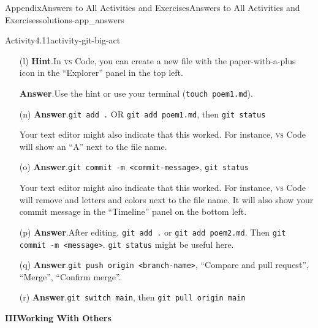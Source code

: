 \documentclass[oneside,10pt,]{book}
\newcommand{\blocktitlefont}{\relax}
\newcommand{\mono}[1]{\texttt{#1}}
\newcommand{\initialism}[1]{\textsc{\MakeLowercase{#1}}}
\begin{document}
\begin{solutions-chapter}{Appendix}{Answers to All Activities and Exercises}{}{Answers to All Activities and Exercises}{}{}{solutions-app_answers}
\begin{activitysolution}{Activity}{4.11}{}{activity-git-big-act}
\begin{enumerate}[font=\bfseries,label=(\alph*),ref=\alph*]
\par
Note that you could split up each poem into its own branch. Depending on the length of your poems, you may want to do that in practice but here we will edit both on one branch. That way you can practice two commits in one push!%
\item[(l)]\noindent\textbf{\blocktitlefont Hint}.\hypertarget{hint-git-big-act-m-b-back}{}\quad{}In \initialism{VS} Code, you can create a new file with the paper-with-a-plus icon in the ``Explorer'' panel in the top left.%
\par\smallskip%
\noindent\textbf{\blocktitlefont Answer}.\hypertarget{answer-git-big-act-m-c-back}{}\quad{}Use the hint or use your terminal (\mono{touch poem1.md}).%
\item[(n)]\noindent\textbf{\blocktitlefont Answer}.\hypertarget{answer-git-big-act-o-b-back}{}\quad{}\mono{git add .} OR \mono{git add poem1.md}, then \mono{git status}%
\par
Your text editor might also indicate that this worked. For instance, \initialism{VS} Code will show an ``A'' next to the file name.%
\item[(o)]\noindent\textbf{\blocktitlefont Answer}.\hypertarget{answer-git-big-act-p-b-back}{}\quad{}\mono{git commit -m \textquotedbl{}<commit-message>\textquotedbl{}}, \mono{git status}%
\par
Your text editor might also indicate that this worked. For instance, \initialism{VS} Code will remove and letters and colors next to the file name. It will also show your commit message in the ``Timeline'' panel on the bottom left.%
\item[(p)]\noindent\textbf{\blocktitlefont Answer}.\hypertarget{answer-git-big-act-q-b-back}{}\quad{}After editing, \mono{git add .} or \mono{git add poem2.md}. Then \mono{git commit -m \textquotedbl{}<message>\textquotedbl{}}. \mono{git status} might be useful here.%
\item[(q)]\noindent\textbf{\blocktitlefont Answer}.\hypertarget{answer-git-big-act-r-b-back}{}\quad{}\mono{git push origin <branch-name>}, ``Compare and pull request'', ``Merge'', ``Confirm merge''.%
\item[(r)]\noindent\textbf{\blocktitlefont Answer}.\hypertarget{answer-git-big-act-s-b-back}{}\quad{}\mono{git switch main}, then \mono{git pull origin main}%
\end{enumerate}%
\end{activitysolution}%
\par\medskip
\noindent\textbf{\Large{}III\space\textperiodcentered\space{}Working With Others\\
}
\end{solutions-chapter}
\end{document}
